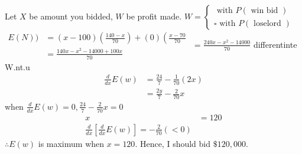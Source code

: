 Let $X$ be amount you bidded, $W$ be profit made.
$W=\left\{\begin{array}{l}\text { with } P(\text { win bid }) \\ \square \text { with } P(\text { loselord })\end{array}\right.$
$\begin{aligned}E(N)) &=(x-100)\left(\frac{140-x}{70}\right)+(0)\left(\frac{x-70}{70}\right.\\ &=\frac{140 x-x^2-14000+100 x}{70} \end{aligned}$
$=\frac{240 x-x^2-14000}{70}$
differentinte W.nt.u
$$
\begin{aligned}
\frac{d}{d x} E(w) &=\frac{24}{7}-\frac{1}{70}(2 x) \\
&=\frac{2 y}{7}-\frac{2}{70} x
\end{aligned}
$$
when $\frac{d}{d x} E(w)=0, \frac{24}{7}-\frac{2}{70} x=0$
$$
\begin{aligned}
x &=120 \\
\frac{d}{d x}\left[\frac{d}{d x} E(w)\right]=-\frac{2}{70}(<0)
\end{aligned}
$$
$\therefore E(w)$ is maximum when $x=120$.
Hence, I should bid $\$ 120,000$.